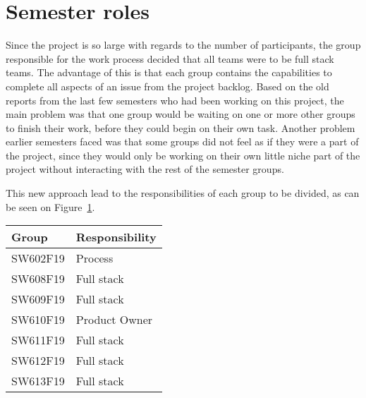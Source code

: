 \section{Semester roles}
Since the project is so large with regards to the number of participants, the group responsible for the work process decided that all teams were to be full stack teams.
The advantage of this is that each group contains the capabilities to complete all aspects of an issue from the project backlog.
Based on the old reports from the last few semesters who had been working on this project, the main problem was that one group would be waiting on one or more other groups to finish their work, before they could begin on their own task.
Another problem earlier semesters faced was that some groups did not feel as if they were a part of the project, since they would only be working on their own little niche part of the project without interacting with the rest of the semester groups.

This new approach lead to the responsibilities of each group to be divided, as can be seen on Figure~\ref{TBL:GroupResponsibility}.
\begin{table}[H]
\centering
\begin{tabular}{|l|l|}
\hline
\textbf{Group} & \textbf{Responsibility} \\ \hline
SW602F19       & Process                 \\ \hline
SW608F19       & Full stack              \\ \hline
SW609F19       & Full stack              \\ \hline
SW610F19       & Product Owner           \\ \hline
SW611F19       & Full stack              \\ \hline
SW612F19       & Full stack              \\ \hline
SW613F19       & Full stack              \\ \hline
\end{tabular}
\label{TBL:GroupResponsibility}
\end{table}
